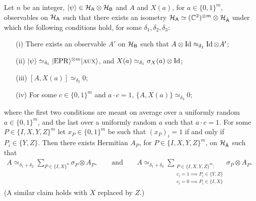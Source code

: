 \begin{lemma}\label{lem:pauli-c-n}
Let $n$ be an integer, $|\psi\rangle \in \mathcal{H}_{{\textsf{A}}} \otimes \mathcal{H}_{{\textsf{B}}}$ and $A$ and $X(a)$, for $a\in\{0,1\}^m$, observables on $\mathcal{H}_{{\textsf{A}}}$ such that there exists an isometry $\mathcal{H}_{{\textsf{A}}} \simeq (\mathbb{C}^2)^{\otimes m}\otimes \mathcal{H}_{\hat{{\textsf{A}}}}$ under which the following conditions hold, for some $\delta_1,\delta_2,\delta_3$:
\begin{enumerate}
\item[(i)] There exists an observable $A'$ on $\mathcal{H}_{\textsf{B}}$ such that $A\otimes \mathop{\rm Id}\nolimits \approx_{\delta_1} \mathop{\rm Id}\nolimits \otimes A'$;
\item[(ii)] $|\psi\rangle \simeq_{\delta_1} |{\rm EPR}\rangle^{\otimes m}|\textsc {aux}\rangle$, and $X(a)\simeq_{\delta_1} \sigma_X(a) \otimes \mathop{\rm Id}\nolimits$;
\item[(iii)] $[A,X(a)]\simeq_{\delta_2} 0$;
\item[(iv)] For some $c\in\{0,1\}^m$ and $a\cdot c=1$, $\{A,X(a)\} \simeq_{\delta_3} 0$;
\end{enumerate}
where the first two conditions are meant on average over a uniformly random
  $a\in\{0,1\}^m$, and the last over a uniformly random $a$ such that $a\cdot c
  =1$. For some $P\in\{I,X,Y,Z\}^m$ let $x_P \in\{0,1\}^m$ be such that $(x_P)_i=1$ if and only if $P_i\in\{Y,Z\}$.
Then there exists Hermitian $A_P$, for $P\in\{I,X,Y,Z\}^m$, on $\mathcal{H}_{\hat{{\textsf{A}}}}$ such that 
\begin{align*}
A \simeq_{\delta_1+\delta_2} \sum_{P\in\{I,X\}^n} \sigma_P \otimes A_P,\qquad\text{and}\qquad A \simeq_{\delta_1+\delta_3} \sum_{\substack{P\in\{I,X,Y,Z\}^m:\\ c_i=1 \implies P_i \in \{Y,Z\}\\  c_i=0 \implies P_i \in \{I,X\}}} \sigma_P \otimes A_P.
\end{align*}
 (A similar claim holds with $X$ replaced by $Z$.)
\end{lemma}

